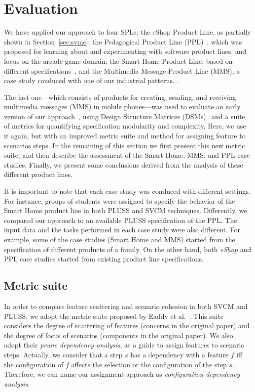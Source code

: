 \documentclass{acm_proc_article-sp}
\begin{document}
\section{Evaluation}
\label{sec:evaluation}

We have applied our approach to four SPLs: the eShop Product Line, as partially shown  in Section~\ref{sec:svmc}; the Pedagogical Product Line
(PPL)~\cite{PPL:2008}, which was proposed for learning about and experimenting
with software product lines, and focus on the arcade game domain; the Smart
Home Product Line, based on different
specifications~\cite{Pohl:2005aa,Alferez:2008aa}, and the Multimedia Message Product Line (MMS), a case study conduced with one of our industrial patterns. .

The last one---which consists of products for creating, sending, and
receiving multimedia messages (MMS) in mobile phones---was used to
evaluate an early version of our approach~\cite{Bonifacio:2008aa},
using Design Structure Matrices (DSMs)~\cite{Baldwin:2000aa,Lopes:2006aa} and a suite of metrics for quantifying specification modularity and complexity. Here, we
use it again, but with an improved metric suite and method for
assigning feature to scenarios steps.
In the remaining of this section we first present this new metric suite,
and then describe the assessment of the Smart Home, MMS, and PPL case
studies. Finally, we present some conclusions derived from the analysis
of these different product lines.

It is important to note that each case study was conduced with different settings. For instance, groups of students were assigned to specify the behavior of the Smart Home product line in both PLUSS and SVCM techniques. Differently, we compared our approach to an available PLUSS specification of the PPL. The input data and the tasks performed in each case study were also different. For example, some of the case studies (Smart Home and MMS) started from the specification of different products of a family. On the other hand, both \emph{eShop} and PPL case studies started from existing product line specifications.

\subsection{Metric suite}\label{sub:metric-suite}

In order to compare feature scattering and scenario cohesion in both SVCM and PLUSS, we adopt the metric suite proposed by Eaddy et al.~\cite{Eaddy:2007aa}. This suite considers the degree of scattering of
features (concerns in the original paper) and the degree of focus of scenarios
(components in the original paper). We also adopt their \emph{prune dependency analysis}, as a guide to assign features to scenario steps. Actually, we consider that a step $s$ has a dependency with a feature $f$ iff the configuration of $f$
affects the selection or the configuration of the step $s$. Therefore, we can name our assignment approach as \emph{configuration dependency analysis}.
\end{document}
